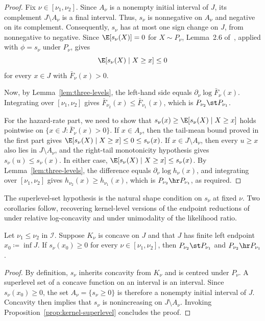 \documentclass[11pt]{article}
\begin{document}
\begin{proof}
Fix \(\nu\in[\nu_1,\nu_2]\). Since \(A_\nu\) is a nonempty initial interval of \(J\), its complement \(J\setminus A_\nu\) is a final interval. Thus, \(s_\nu\) is nonnegative on \(A_\nu\) and negative on its complement. Consequently, \(s_\nu\) has at most one sign change on \(J\), from nonnegative to negative. Since \(\E[s_\nu(X)]=0\) for \(X\sim P_\nu\), Lemma~2.6 of~\cite{DerbaziPairwise}, applied with \(\phi=s_\nu\) under \(P_\nu\), gives
\[
\E[s_\nu(X)\mid X\ge x]\le 0
\]
for every \(x\in J\) with \(\bar F_\nu(x)>0\).

Now, by Lemma~\ref{lem:three-levels}, the left-hand side equals \(\partial_\nu\log\bar F_\nu(x)\). Integrating over \([\nu_1,\nu_2]\) gives \(\bar F_{\nu_2}(x)\le\bar F_{\nu_1}(x)\), which is \(P_{\nu_2}\st P_{\nu_1}\).

For the hazard-rate part, we need to show that \(s_\nu(x)\ge \E[s_\nu(X)\mid X\ge x]\) holds pointwise on \(\{x\in J:\bar F_\nu(x)>0\}\). If \(x\in A_\nu\), then the tail-mean bound proved in the first part gives \(\E[s_\nu(X)\mid X\ge x]\le0\le s_\nu(x)\). If \(x\in J\setminus A_\nu\), then every \(u\ge x\) also lies in \(J\setminus A_\nu\), and the right-tail monotonicity hypothesis gives \(s_\nu(u)\le s_\nu(x)\). In either case, \(\E[s_\nu(X)\mid X\ge x]\le s_\nu(x)\). By Lemma~\ref{lem:three-levels}, the difference equals \(\partial_\nu\log h_\nu(x)\), and integrating over \([\nu_1,\nu_2]\) gives \(h_{\nu_2}(x)\ge h_{\nu_1}(x)\), which is \(P_{\nu_2}\hr P_{\nu_1}\), as required.
\end{proof}

The superlevel-set hypothesis is the natural shape condition on \(s_\nu\) at fixed \(\nu\). Two corollaries follow, recovering kernel-level versions of the endpoint reductions of~\cite{DerbaziPairwise} under relative log-concavity and under unimodality of the likelihood ratio.

\begin{cor}
\label{cor:concave-kernel}
Let \(\nu_1\le\nu_2\) in \(\mathcal I\). Suppose \(K_\nu\) is concave on \(J\) and that \(J\) has finite left endpoint \(x_0\coloneqq \inf J\). If \(s_\nu(x_0)\ge 0\) for every \(\nu\in[\nu_1,\nu_2]\), then \(P_{\nu_2}\st P_{\nu_1}\) and \(P_{\nu_2}\hr P_{\nu_1}\).
\end{cor}

\begin{proof}
By definition, \(s_\nu\) inherits concavity from \(K_\nu\) and is centred under \(P_\nu\). A superlevel set of a concave function on an interval is an interval. Since \(s_\nu(x_0)\ge0\), the set \(A_\nu=\{s_\nu\ge 0\}\) is therefore a nonempty initial interval of \(J\). Concavity then implies that \(s_\nu\) is nonincreasing on \(J\setminus A_\nu\). Invoking Proposition~\ref{prop:kernel-superlevel} concludes the proof.
\end{proof}
\end{document}
